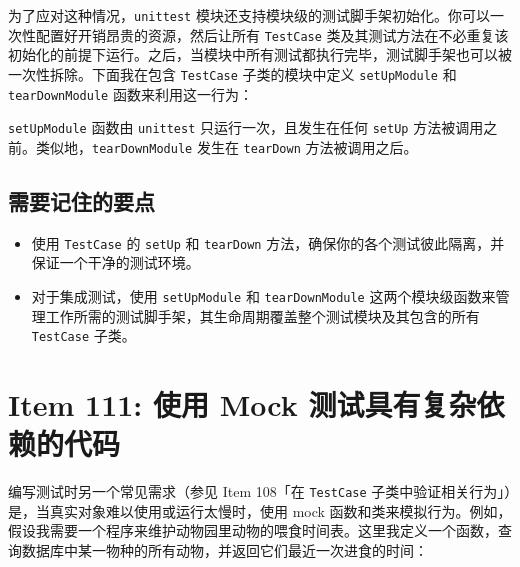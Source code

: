 为了应对这种情况，\texttt{unittest} 模块还支持模块级的测试脚手架初始化。你可以一次性配置好开销昂贵的资源，然后让所有 \texttt{TestCase} 类及其测试方法在不必重复该初始化的前提下运行。之后，当模块中所有测试都执行完毕，测试脚手架也可以被一次性拆除。下面我在包含 \texttt{TestCase} 子类的模块中定义 \texttt{setUpModule} 和 \texttt{tearDownModule} 函数来利用这一行为：


\texttt{setUpModule} 函数由 \texttt{unittest} 只运行一次，且发生在任何 \texttt{setUp} 方法被调用之前。类似地，\texttt{tearDownModule} 发生在 \texttt{tearDown} 方法被调用之后。

\subsection{需要记住的要点}

\begin{itemize}
\item 使用 \texttt{TestCase} 的 \texttt{setUp} 和 \texttt{tearDown} 方法，确保你的各个测试彼此隔离，并保证一个干净的测试环境。
\item 对于集成测试，使用 \texttt{setUpModule} 和 \texttt{tearDownModule} 这两个模块级函数来管理工作所需的测试脚手架，其生命周期覆盖整个测试模块及其包含的所有 \texttt{TestCase} 子类。
\end{itemize}

\section{Item 111: 使用 Mock 测试具有复杂依赖的代码}

编写测试时另一个常见需求（参见 Item 108「在 \texttt{TestCase} 子类中验证相关行为」）是，当真实对象难以使用或运行太慢时，使用 mock 函数和类来模拟行为。例如，假设我需要一个程序来维护动物园里动物的喂食时间表。这里我定义一个函数，查询数据库中某一物种的所有动物，并返回它们最近一次进食的时间：

